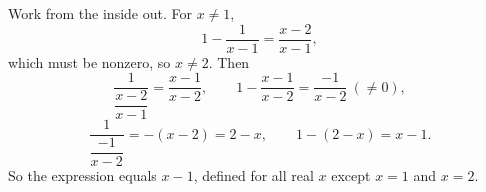Work from the inside out. For $x\ne1$,
\[
1-\dfrac{1}{x-1}=\dfrac{x-2}{x-1},
\]
which must be nonzero, so $x\ne2$. Then
\[
\dfrac{1}{\dfrac{x-2}{x-1}}=\dfrac{x-1}{x-2},\qquad 1-\dfrac{x-1}{x-2}=\dfrac{-1}{x-2}\ (\ne0),
\]
\[
\dfrac{1}{\dfrac{-1}{x-2}}=-(x-2)=2-x,\qquad 1-(2-x)=x-1 .
\]
So the expression equals $\boxed{x-1}$, defined for all real $x$ except $x=1$ and $x=2$.
